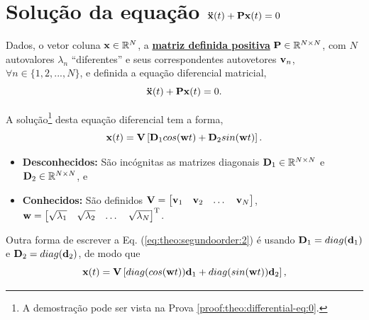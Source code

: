 \section{ Solução da equação $\DDTVECTOR{x}(t) + \MATRIX{P} \VECTOR{x}(t)=0$ }

\begin{theorem}[Equação 
$\DDTVECTOR{x}(t) + \MATRIX{P} \VECTOR{x}(t)=0$ com matriz $\MATRIX{P}$ definida positiva:]
\label{theo:differential-eq:0}
Dados, o vetor coluna $\VECTOR{x} \in \mathbb{R}^N$, 
a \hyperref[def:positivematrix0]{\textbf{matriz definida positiva}} $\MATRIX{P} \in \mathbb{R}^{N\times N}$,
com $N$ autovalores $\lambda_n$ ``diferentes'' e seus correspondentes autovetores $\VECTOR{v}_n$,
$\forall n \in \{1, 2, ..., N\}$, 
e definida a equação diferencial matricial,
\begin{equation}\label{eq:theo:segundoorder:1}
\DDTVECTOR{x}(t) + \MATRIX{P} \VECTOR{x}(t)=0.
\end{equation}

A solução\footnote{A
demostração pode ser vista na Prova \ref{proof:theo:differential-eq:0}.} desta equação diferencial tem  a forma,
\begin{equation}\label{eq:theo:segundoorder:2}
 \VECTOR{x}(t)= \MATRIX{V}\left[\MATRIX{D}_1 cos(\VECTOR{w}t) + \MATRIX{D}_2 sin(\VECTOR{w}t) \right].
\end{equation}
\begin{itemize}
\item \textbf{Desconhecidos:} São incógnitas as matrizes diagonais $\MATRIX{D}_1 \in \mathbb{R}^{N \times N}$ e $\MATRIX{D}_2  \in \mathbb{R}^{N \times N}$, e
\item  \textbf{Conhecidos:} São definidos $\MATRIX{V}=
\begin{bmatrix}
\VECTOR{v}_1 & \VECTOR{v}_2 & \dots & \VECTOR{v}_N
\end{bmatrix}$, 
$\VECTOR{w}=
\begin{bmatrix}
\sqrt{\lambda_1} & \sqrt{\lambda_2} & \dots & \sqrt{\lambda_N}
\end{bmatrix}^{\transpose}$.
\end{itemize}
\end{theorem}

\begin{corollary}
\label{coro:differential-eq:0}
Outra forma de escrever a Eq. (\ref{eq:theo:segundoorder:2}) é usando $\MATRIX{D}_1=\funcdiag(\VECTOR{d}_1)$ e $\MATRIX{D}_2=\funcdiag(\VECTOR{d}_2)$, de modo que
\begin{equation}\label{eq:coro:segundoorder:1}
 \VECTOR{x}(t)= \MATRIX{V}\left[ \funcdiag(cos(\VECTOR{w}t))\VECTOR{d}_1 +  \funcdiag(sin(\VECTOR{w}t)) \VECTOR{d}_2 \right],
\end{equation}
\end{corollary}


